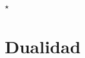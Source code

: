 \documentclass[11pt]{report}
\begin{document}





\begin{center}
    $\star$
\end{center}


\chapter{Dualidad}
\end{document}
